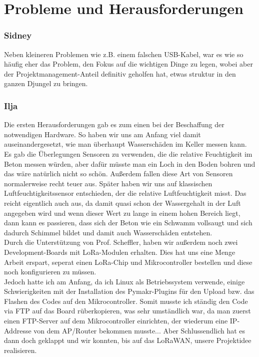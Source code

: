 \section{Probleme und Herausforderungen} \label{Probleme und Herausforderungen}

\subsubsection{Sidney}
Neben kleineren Problemen wie z.B. einem falschen USB-Kabel, war es wie so häufig eher das Problem, den Fokus auf die wichtigen Dinge zu legen, wobei aber der Projektmanagement-Anteil definitiv geholfen hat, etwas struktur in den ganzen Djungel zu bringen.

\subsubsection{Ilja}
Die ersten Herausforderungen gab es zum einen bei der Beschaffung der notwendigen Hardware. So haben wir uns am Anfang viel damit auseinandergesetzt, wie man überhaupt Wasserschäden im Keller messen kann. Es gab die Überlegungen Sensoren zu verwenden, die die relative Feuchtigkeit im Beton messen würden, aber dafür müsste man ein Loch in den Boden bohren und das wäre natürlich nicht so schön. Außerdem fallen diese Art von Sensoren normalerweise recht teuer aus. Später haben wir uns auf klassischen Luftfeuchtigkeitssensor entschieden, der die relative Luftfeuchtigkeit misst. Das reicht eigentlich auch aus, da damit quasi schon der Wassergehalt in der Luft angegeben wird und wenn dieser Wert zu lange in einem hohen Bereich liegt, dann kann es passieren, dass sich der Beton wie ein Schwamm vollsaugt und sich dadurch Schimmel bildet und damit auch Wasserschäden entstehen.\\
Durch die Unterstützung von Prof. Scheffler, haben wir außerdem noch zwei Development-Boards mit LoRa-Modulen erhalten. Dies hat uns eine Menge Arbeit erspart, seperat einen LoRa-Chip und Mikrocontroller bestellen und diese noch konfigurieren zu müssen. \\
Jedoch hatte ich am Anfang, da ich Linux als Betriebssystem verwende, einige Schwierigkeiten mit der Installation des Pymakr-Plugins für den Upload bzw. das Flashen des Codes auf den Mikrocontroller. Somit musste ich ständig den Code via FTP auf das Board rüberkopieren, was sehr umständlich war, da man zuerst einen FTP-Server auf dem Mikrocontroller einrichten, der wiederum eine IP-Addresse von dem AP/Router bekommen musste... Aber Schlussendlich hat es dann doch geklappt und wir konnten, bis auf das LoRaWAN, unsere Projektidee realisieren.



